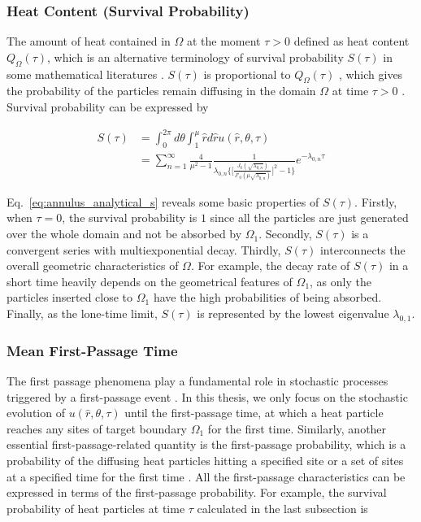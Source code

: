 {\subsubsection{Heat Content (Survival Probability)}

The amount of heat contained in $\Omega$ at the moment $\tau > 0$
defined as heat content $Q_{\Omega}(\tau)$, which is an alternative
terminology of survival probability $S(\tau)$ in some mathematical
literatures \cite{birkhoff1954note} \cite{van1994heat}
\cite{gilkey1994heat}. $S(\tau)$ is proportional to $Q_{\Omega}(\tau)$
\cite{kalinay2011survival}, which gives the probability of the
particles remain diffusing in the domain $\Omega$ at time $\tau > 0$
\cite{aalen2008survival}. Survival probability can be expressed by

\begin{equation}\label{eq:annulus_analytical_s}
  \begin{split}
    S(\tau) &= \int_{0}^{2\pi} d\theta \int_{1}^{\mu} \hat r d \hat r
    u(\hat r, \theta, \tau)\\ &= \sum_{n=1}^{\infty} \frac{4}{\mu^2 -
      1} \frac{1}{\lambda_{0,n}
      \bigg\{\bigg[\frac{J_0(\sqrt{\lambda_{0,n}})}{J'_0(\mu
          \sqrt{\lambda_{0,n}})}\bigg]^2 -1\bigg\}} e^{-\lambda_{0, n}
      \tau}
  \end{split}
\end{equation}

Eq.~\ref{eq:annulus_analytical_s} reveals some basic properties of
$S(\tau)$. Firstly, when $\tau=0$, the survival probability is $1$
since all the particles are just generated over the whole domain and
not be absorbed by $\Omega_1$. Secondly, $S(\tau)$ is a convergent
series with multiexponential decay. Thirdly, $S(\tau)$ interconnects
the overall geometric characteristics of $\Omega$. For example, the
decay rate of $S(\tau)$ in a short time heavily depends on the
geometrical features of $\Omega_1$, as only the particles inserted
close to $\Omega_1$ have the high probabilities of being
absorbed. Finally, as the lone-time limit, $S(\tau)$ is represented by
the lowest eigenvalue $\lambda_{0,1}$.


\subsubsection{Mean First-Passage Time}

The first passage phenomena play a fundamental role in stochastic
processes triggered by a first-passage event
\cite{van1992stochastic}. In this thesis, we only focus on the
stochastic evolution of $u(\hat r, \theta, \tau)$ until the
first-passage time, at which a heat particle reaches any sites of
target boundary $\Omega_1$ for the first time. Similarly, another
essential first-passage-related quantity is the first-passage
probability, which is a probability of the diffusing heat particles
hitting a specified site or a set of sites at a specified time for the
first time \cite{redner2001guide}. All the first-passage
characteristics can be expressed in terms of the first-passage
probability. For example, the survival probability of heat particles
at time $\tau$ calculated in the last subsection is

}
